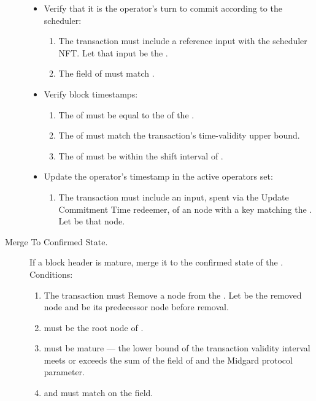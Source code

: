 \documentclass[../midgard.tex]{subfiles}
\begin{document}
\begin{description}
\begin{itemize}
            \item Verify that it is the operator's turn to commit according to the scheduler:
            \begin{enumerate}[resume]
                \item The transaction must include a reference input with the scheduler NFT.
                  Let that input be the .
                \item The  field of  must match .
            \end{enumerate}

            \item Verify block timestamps:
            \begin{enumerate}[resume]
                \item The  of  must be equal to the  of the .
                \item The  of  must match the transaction's time-validity upper bound.
                \item The  of  must be within the shift interval of .
            \end{enumerate}
            
            \item Update the operator's timestamp in the active operators set:
            \begin{enumerate}[resume]
                \item The transaction must include an input, spent via the Update Commitment Time redeemer, of an  node with a key matching the .
                  Let  be that node.
            \end{enumerate}
        \end{itemize}

    \item[Merge To Confirmed State.] If a block header is mature, merge it to the confirmed state of the .
      Conditions:
    \begin{enumerate}
        \item The transaction must Remove a node from the .
          Let  be the removed node and  be its predecessor node before removal.
        \item {} must be the root node of .
        \item {} must be mature --- the lower bound of the transaction validity interval meets or exceeds the sum of the  field of  and the Midgard  protocol parameter.
        \item {} and  must match on the  field.
    \end{enumerate}


\end{description}
\end{document}
